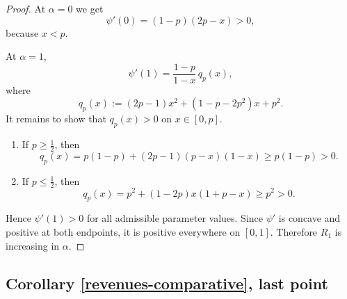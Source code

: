 \documentclass[11pt]{article}
\theoremstyle{plain}
\theoremstyle{definition}
\theoremstyle{plain}
\theoremstyle{plain}
\theoremstyle{plain}
\theoremstyle{plain}
\numberwithin{equation}{section}
\begin{document}
\begin{proof}
\vspace{2mm}

\noindent At $\alpha=0$ we get
\begin{equation*}
    \psi'(0) = (1-p)(2p-x) > 0,
\end{equation*}
because $x < p$.

\vspace{2mm}

\noindent At $\alpha=1$,
\begin{equation*}
    \psi'(1) = \frac{1-p}{1-x} \, q_p(x),
\end{equation*}
where
\begin{equation*}
    q_p(x) := (2p-1)x^2 + (1-p-2p^2)x + p^2.
\end{equation*}
It remains to show that $q_p(x)>0$ on $x \in [0,p]$.

\begin{enumerate}
    \item If $p \geq \frac{1}{2}$, then
\begin{equation*}
    q_p(x) = p(1-p) + (2p-1)(p-x)(1-x) \geq p(1-p) > 0.
\end{equation*}

    \item If $p \leq \frac{1}{2}$, then
\begin{equation*}
    q_p(x) = p^2 + (1-2p)x(1+p-x) \geq p^2 > 0.
\end{equation*}
\end{enumerate}

\noindent Hence $\psi'(1)>0$ for all admissible parameter values. Since $\psi'$ is concave and positive at both endpoints, it is positive everywhere on $[0,1]$. Therefore $R_1$ is increasing in $\alpha$.
\end{proof}
\vspace{0.4cm}

\subsection*{Corollary \ref{revenues-comparative}, last point}
\end{document}

